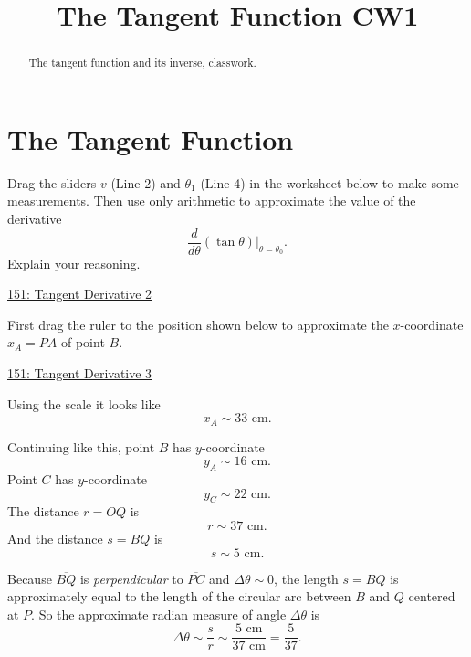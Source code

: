 \documentclass{ximera}
\title{The Tangent Function CW1}
\begin{document}
\begin{abstract}
The tangent function and its inverse, classwork.
\end{abstract}
\maketitle


\section{The Tangent Function}

\begin{question} \label{Qfer34fds0}

Drag the sliders $v$ (Line 2) and $\theta_1$ (Line 4) in the worksheet below to make some measurements. Then use only arithmetic to approximate the value of the derivative
\[
  \frac{d}{d\theta} \left( \tan\theta \right) \Big|_{\theta = \theta_0}.
\]
Explain your reasoning.

\begin{onlineOnly}
    \begin{center}
\end{center}
\end{onlineOnly}

\href{https://www.desmos.com/calculator/omoajhcokg}{151: Tangent Derivative 2}


\begin{explanation}

First drag the ruler to the position shown below to approximate the $x$-coordinate $x_A = PA$ of point $B$.

\begin{onlineOnly}
    \begin{center}
\end{center}
\end{onlineOnly}

\href{https://www.desmos.com/calculator/hdox48kv6y}{151: Tangent Derivative 3}

Using the scale it looks like
\[
     x_A  \sim 33 \text{ cm}.
\]

Continuing like this, point $B$ has $y$-coordinate
\[
   y_A  \sim 16 \text{ cm}.
\]
Point $C$ has $y$-coordinate
\[
   y_C \sim 22 \text{ cm}.
\]
The distance $r = OQ$ is
\[
   r \sim 37 \text{ cm} .
\]
And the distance $s = BQ$ is 
\[
   s \sim 5 \text{ cm}.
\]

Because $\overline{BQ}$ is \emph{perpendicular} to $\overline{PC}$ and $\Delta \theta \sim 0$, the length $s=BQ$ is approximately equal to the length of the circular arc between $B$ and $Q$ centered at $P$. So the approximate radian measure of angle $\Delta \theta$ is
\[
  \Delta \theta \sim \frac{s}{r} \sim \frac{5 \text{ cm}}{37 \text{ cm}} = \frac{5}{37}.
\]


\end{explanation}
\end{question}
\end{document}
